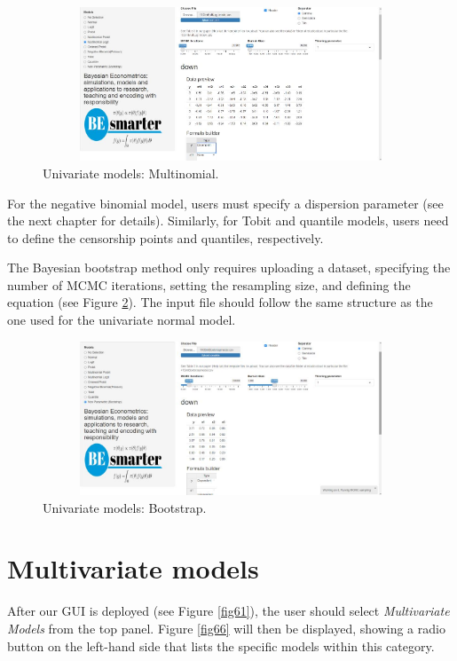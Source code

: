 \begin{figure}
	\includegraphics[width=340pt, height=130pt]{Chapters/chapterGUI/figures/Figure4.jpg}
	\caption[List of figure caption goes here]{Univariate models: Multinomial.}\label{fig64}
\end{figure}

For the negative binomial model, users must specify a dispersion parameter (see the next chapter for details). Similarly, for Tobit and quantile models, users need to define the censorship points and quantiles, respectively.

The Bayesian bootstrap method only requires uploading a dataset, specifying the number of MCMC iterations, setting the resampling size, and defining the equation (see Figure \ref{fig65}). The input file should follow the same structure as the one used for the univariate normal model.

\begin{figure}
	\includegraphics[width=340pt, height=130pt]{Chapters/chapterGUI/figures/Figure5.jpg}
	\caption[List of figure caption goes here]{Univariate models: Bootstrap.}\label{fig65}
\end{figure}  

\section{Multivariate models}\label{secGUI3}
After our GUI is deployed (see Figure \ref{fig61}), the user should select \textit{Multivariate Models} from the top panel. Figure \ref{fig66} will then be displayed, showing a radio button on the left-hand side that lists the specific models within this category.

